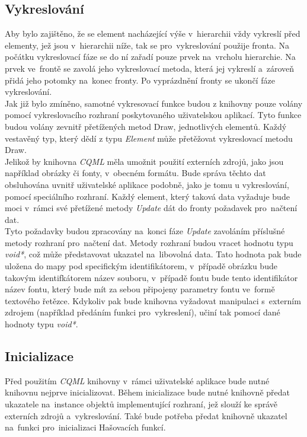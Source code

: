 \documentclass[11pt,twoside,a4paper]{book}
\begin{document}
\subsection {Vykreslování}
Aby bylo zajištěno, že se element nacházející výše v~hierarchii vždy vykreslí před elementy, jež jsou v~hierarchii níže, tak se pro~vykreslování použije fronta. Na počátku vykreslovací fáze se do ní zařadí pouze prvek na~vrcholu hierarchie. Na prvek ve~frontě se zavolá jeho vykreslovací metoda, která jej vykreslí a~zároveň přidá jeho potomky na~konec fronty. Po vyprázdnění fronty se ukončí fáze vykreslování.\\
Jak již bylo zmíněno, samotné vykresovací funkce budou z knihovny pouze volány pomocí vykreslovacího rozhraní poskytovaného uživatelskou aplikací. Tyto funkce budou volány zevnitř přetížených metod Draw, jednotlivých elementů. Každý vestavěný typ, který dědí z typu \textit{Element} může přetěžovat vykreslovací metodu Draw.\\
Jelikož by knihovna \textit{CQML} měla umožnit použití externích zdrojů, jako jsou například obrázky či fonty, v~obecném formátu. Bude správa těchto dat obsluhována uvnitř uživatelské aplikace podobně, jako je tomu u vykreslování, pomocí speciálního rozhraní. Každý element, který taková data vyžaduje bude moci v~rámci své přetížené metody \textit{Update} dát do fronty požadavek pro~načtení dat.\\
Tyto požadavky budou zpracovány na~konci fáze \textit{Update} zavoláním příslušné metody rozhraní pro~načtení dat. Metody rozhraní budou vracet hodnotu typu \textit{void*}, což může představovat ukazatel na~libovolná data. Tato hodnota pak bude uložena do mapy pod specifickým identifikátorem, v~případě obrázku bude takovým identifkátorem název souboru, v~případě fontu bude tento identifikátor název fontu, který bude mít za sebou připojeny parametry fontu ve~formě textového řetězce. Kdykoliv pak bude knihovna vyžadovat manipulaci s~externím zdrojem (například předáním funkci pro~vykreslení), učiní tak pomocí dané hodnoty typu \textit{void*}. \\
\subsection {Inicializace}
Před použitím \textit{CQML} knihovny v~rámci uživatelské aplikace bude nutné knihovnu nejprve inicializovat. Během inicializace bude nutné knihovně předat ukazatele na~instance objektů implementující rozhraní, jež slouží ke správě externích zdrojů a~vykreslování. Také bude potřeba předat knihovně ukazatel na~funkci pro~inicializaci Hašovacích funkcí.\\
\end{document}
